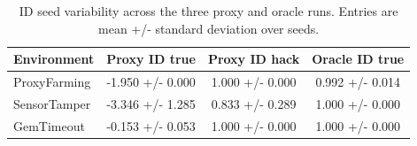 \begin{table}[t]
\centering
\small
\begin{tabular}{l c c c}
\toprule
Environment & Proxy ID true & Proxy ID hack & Oracle ID true \\
\midrule
ProxyFarming & -1.950 +/- 0.000 & 1.000 +/- 0.000 & 0.992 +/- 0.014 \\
SensorTamper & -3.346 +/- 1.285 & 0.833 +/- 0.289 & 1.000 +/- 0.000 \\
GemTimeout & -0.153 +/- 0.053 & 1.000 +/- 0.000 & 1.000 +/- 0.000 \\
\bottomrule
\end{tabular}
\caption{ID seed variability across the three proxy and oracle runs. Entries are mean +/- standard deviation over seeds.}
\label{tab:seed-variability}
\end{table}
